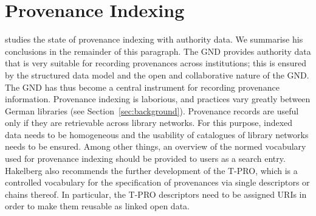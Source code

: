 %
%
%
%
%
%
\section{Provenance Indexing}
\label{sec:provenance_indexing}

\textcite{Hakelberg2016}
studies the state of provenance indexing with authority data.
We summarise his conclusions in the remainder of this paragraph.
The \gls{GND} provides authority data that is
very suitable for recording provenances across institutions;
this is ensured by the structured data model
and the open and collaborative nature of the \gls{GND}.
The \gls{GND} has thus become a central instrument for recording
provenance information.
Provenance indexing is laborious, and
practices vary greatly between German libraries (see Section~\ref{sec:background}).
Provenance records are useful only if
they are retrievable across library networks.
For this purpose, indexed data needs to be homogeneous
and the usability of catalogues of library networks needs to be ensured.
Among other things, an overview
of the normed vocabulary used for provenance indexing
should be provided to users as a search entry.
Hakelberg also recommends the further development of the \gls{T-PRO},
which is a controlled vocabulary
for the specification of provenances via single descriptors or chains thereof.
In particular, the T-PRO descriptors need to be assigned \glspl{URI}
in order to make them reusable as linked open data. %

